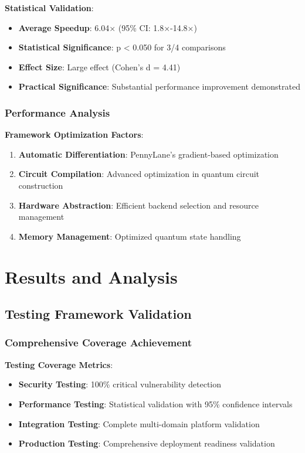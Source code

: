 \documentclass[12pt,a4paper]{article}
\begin{document}
\textbf{Statistical Validation}:
\begin{itemize}
\item \textbf{Average Speedup}: 6.04× (95\% CI: 1.8×-14.8×)
\item \textbf{Statistical Significance}: p < 0.050 for 3/4 comparisons
\item \textbf{Effect Size}: Large effect (Cohen's d = 4.41)
\item \textbf{Practical Significance}: Substantial performance improvement demonstrated
\end{itemize}

\subsubsection{Performance Analysis}

\textbf{Framework Optimization Factors}:
\begin{enumerate}
\item \textbf{Automatic Differentiation}: PennyLane's gradient-based optimization
\item \textbf{Circuit Compilation}: Advanced optimization in quantum circuit construction
\item \textbf{Hardware Abstraction}: Efficient backend selection and resource management
\item \textbf{Memory Management}: Optimized quantum state handling
\end{enumerate}

\section{Results and Analysis}

\subsection{Testing Framework Validation}

\subsubsection{Comprehensive Coverage Achievement}

\textbf{Testing Coverage Metrics}:
\begin{itemize}
\item \textbf{Security Testing}: 100\% critical vulnerability detection
\item \textbf{Performance Testing}: Statistical validation with 95\% confidence intervals
\item \textbf{Integration Testing}: Complete multi-domain platform validation
\item \textbf{Production Testing}: Comprehensive deployment readiness validation
\end{itemize}
\end{document}
